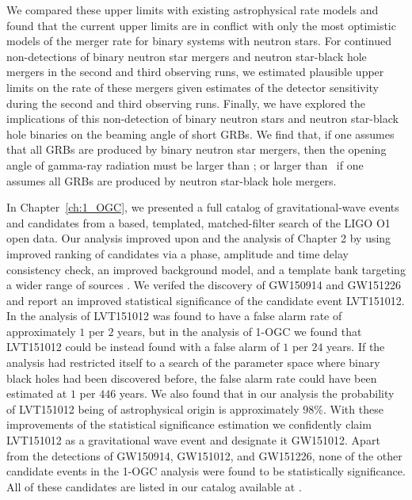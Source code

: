 We compared these upper limits with existing astrophysical rate models and found that the
current upper limits are in conflict with only the most optimistic models of the merger
rate for binary systems with neutron stars. For continued non-detections of
binary neutron star mergers and neutron star-black hole mergers in the second and
third observing runs,
we estimated plausible upper limits on the rate of these mergers given estimates of the detector
sensitivity during the second and third observing runs.
Finally, we have explored the implications of this non-detection of binary neutron stars and
neutron star-black hole binaries on
the beaming angle of short \acp{GRB}. We find that, if one assumes that all \acp{GRB}
are produced by binary neutron star mergers, then the opening angle of gamma-ray radiation must be larger
than \GRBBNSBeamingAngleConstraint; or larger than \GRBNSBHFiveBeamingAngleConstraint\ if
one assumes all \acp{GRB} are produced by neutron star-black hole mergers.


In Chapter~\ref{ch:1_OGC}, we presented a full catalog of gravitational-wave events and candidates from a \pycbc{}\-based, templated, matched-filter search of the LIGO O1 open data. Our analysis improved upon \cite{TheLIGOScientific:2016pea,Abbott:2016ymx} and the analysis of Chapter 2 by using improved ranking of candidates via a phase, amplitude and time delay consistency check, an improved background model, and a template bank targeting a wider range of sources \citep{Nitz:2017svb, Nitz:2017lco,DalCanton:2017ala}. We verifed the discovery of GW150914 and GW151226 and report an improved statistical significance of the candidate event LVT151012. In the analysis of \cite{TheLIGOScientific:2016pea,Abbott:2016ymx} LVT151012 was found to have a false alarm rate of approximately $1$ per $2$ years, but in the analysis of 1-OGC we found that LVT151012 could be instead found with a false alarm of $1$ per $24$ years. If the analysis had restricted itself to a search of the parameter space where binary black holes had been discovered before, the false alarm rate could have been estimated at $1$ per $446$ years. We also found that in our analysis the probability of LVT151012 being of astrophysical origin is approximately $98 \%$. With these improvements of the statistical significance estimation we confidently claim LVT151012 as a gravitational wave event and designate it GW151012. Apart from the detections of GW150914, GW151012, and GW151226, none of the other candidate events in the 1-OGC analysis were found to be statistically significance. All of these candidates are listed in our catalog available at \release{}.

